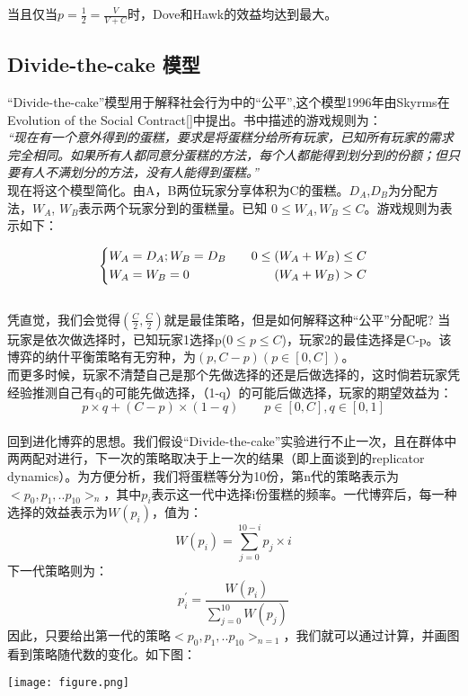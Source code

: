 \documentclass[12pt]{article}
\begin{document}
当且仅当$p=\frac{1}{2}=\frac{V}{V+C}$时，Dove和Hawk的效益均达到最大。


\subsection{Divide-the-cake 模型}
“Divide-the-cake”模型用于解释社会行为中的“公平”,这个模型1996年由Skyrms在Evolution of the Social Contract[\cite{skyrms1996evolution}]中提出。书中描述的游戏规则为：\\

\emph{“现在有一个意外得到的蛋糕，要求是将蛋糕分给所有玩家，已知所有玩家的需求完全相同。如果所有人都同意分蛋糕的方法，每个人都能得到划分到的份额；但只要有人不满划分的方法，没有人能得到蛋糕。”}\\



现在将这个模型简化。由A，B两位玩家分享体积为C的蛋糕。$D_A$,$D_B$为分配方法，$W_A$, $W_B$表示两个玩家分到的蛋糕量。已知 $0\leq W_A,W_B \leq C$。游戏规则为表示如下：

\begin{displaymath}
\left\{
\begin{gathered}
W_A=D_A; W_B=D_B \qquad \hfill {0\leq (W_A+W_B)\leq C}  \\
W_A=W_B=0 \qquad \hfill (W_A+W_B)> C\\
\end{gathered}
\right.
\end{displaymath}\\

凭直觉，我们会觉得$(\frac{C}{2},\frac{C}{2})$就是最佳策略，但是如何解释这种“公平”分配呢?
当玩家是依次做选择时，已知玩家1选择p($0\leq p\leq C$)，玩家2的最佳选择是C-p。该博弈的纳什平衡策略有无穷种，为$(p,C-p) (p\in[0,C])$。\\
而更多时候，玩家不清楚自己是那个先做选择的还是后做选择的，这时倘若玩家凭经验推测自己有q的可能先做选择，（1-q）的可能后做选择，玩家的期望效益为：
$$p\times q+(C-p)\times (1-q)\qquad p\in[0,C],q\in[0,1]$$ \\

回到进化博弈的思想。我们假设“Divide-the-cake”实验进行不止一次，且在群体中两两配对进行，下一次的策略取决于上一次的结果（即上面谈到的replicator dynamics）。为方便分析，我们将蛋糕等分为10份，第n代的策略表示为$<p_0,p_1,..p_{10}>_n$，其中$p_i$表示这一代中选择i份蛋糕的频率。一代博弈后，每一种选择的效益表示为$W(p_i)$，值为：
$$W(p_i)=\sum_{j=0}^{10-i}p_j\times i$$
下一代策略则为：
$$p^{'}_{i}=\frac{W(p_i)}{\sum_{j=0}^{10}W(p_j)}$$
因此，只要给出第一代的策略$<p_0,p_1,..p_{10}>_{n=1}$，我们就可以通过计算，并画图看到策略随代数的变化。如下图：
\begin{center}
\texttt{[image: figure.png]}
\end{center}
\end{document}
